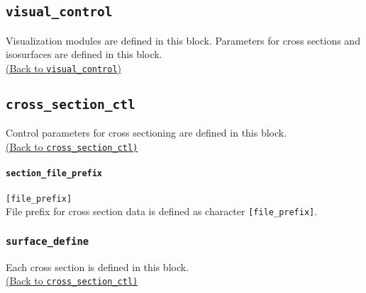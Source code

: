 %
%
\subsection{\tt visual\_control}
\label{href_t:visual_control}
Visualization modules are defined in this block. Parameters for cross sections and isosurfaces are defined in this block. \\
\hyperref[href_i:visual_control]{(Back to {\tt visual\_control})}


%
%
%
%
\subsection{\tt cross\_section\_ctl}
\label{href_t:cross_section_ctl}
Control parameters for cross sectioning are defined in this block. \\
\hyperref[href_i:cross_section_ctl]{(Back to {\tt cross\_section\_ctl)}}

\paragraph{\tt section\_file\_prefix}
\label{href_t:section_file_prefix}
\verb|[file_prefix]| \\
File prefix for cross section data is defined as character \verb|[file_prefix]|.

\subsubsection{\tt surface\_define}
\label{href_t:surface_define}
Each cross section is defined in this block. \\
\hyperref[href_i:cross_section_ctl]{(Back to {\tt cross\_section\_ctl)}} \\

